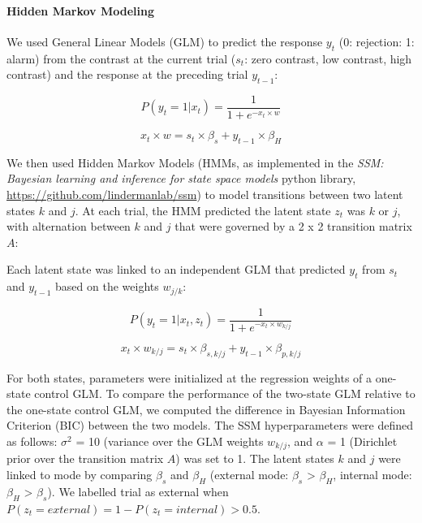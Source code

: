 \documentclass[
]{article}
\begin{document}
\hypertarget{hidden-markov-modeling}{%
\paragraph{Hidden Markov Modeling}\label{hidden-markov-modeling}}

We used General Linear Models (GLM) to predict the response \(y_t\) (0:
rejection: 1: alarm) from the contrast at the current trial (\(s_t\):
zero contrast, low contrast, high contrast) and the response at the
preceding trial \(y_{t-1}\):

\begin{equation}
P(y_t = 1 | x_t) = \frac{1}{1 + e^{-x_t \times w}} 
\end{equation}

\begin{equation}
x_t \times w =  s_t \times \beta_s + y_{t-1} \times \beta_H
\end{equation}

We then used Hidden Markov Models (HMMs, as implemented in the
\emph{SSM: Bayesian learning and inference for state space models}
python library, \url{https://github.com/lindermanlab/ssm}) to model
transitions between two latent states \(k\) and \(j\). At each trial,
the HMM predicted the latent state \(z_t\) was \(k\) or \(j\), with
alternation between \(k\) and \(j\) that were governed by a 2 x 2
transition matrix \(A\):

Each latent state was linked to an independent GLM that predicted
\(y_t\) from \(s_t\) and \(y_{t-1}\) based on the weights \(w_{j/k}\):

\begin{equation}
P(y_t = 1 | x_t, z_t) = \frac{1}{1 + e^{-x_t \times w_{k/j}}} 
\end{equation}

\begin{equation}
x_t \times w_{k/j} =  s_t \times \beta_{s,k/j} + y_{t-1} \times \beta_{p,k/j} 
\end{equation}

For both states, parameters were initialized at the regression weights
of a one-state control GLM. To compare the performance of the two-state
GLM relative to the one-state control GLM, we computed the difference in
Bayesian Information Criterion (BIC) between the two models. The SSM
hyperparameters were defined as follows: \(\sigma^2\) = 10 (variance
over the GLM weights \(w_{k/j}\), and \(\alpha\) = 1 (Dirichlet prior
over the transition matrix \(A\)) was set to 1. The latent states \(k\)
and \(j\) were linked to mode by comparing \(\beta_s\) and \(\beta_H\)
(external mode: \(\beta_s\) \textgreater{} \(\beta_H\), internal mode:
\(\beta_H\) \textgreater{} \(\beta_s\)). We labelled trial as external
when \(P(z_t = external) = 1 - P(z_t = internal) > 0.5\).
\end{document}
